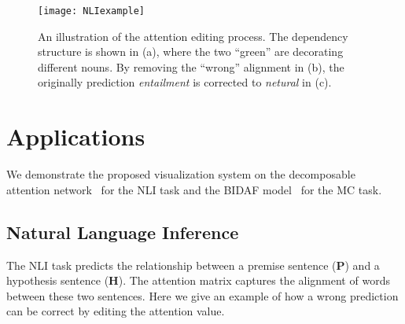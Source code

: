 \begin{figure*}[t]
\centering
\vspace{-2mm}
 \texttt{[image: NLIexample]}
  \vspace{-7mm}
 \caption{
An illustration of the attention editing process.
The dependency structure is shown in (a), where the two ``green'' are decorating different nouns.
By removing the ``wrong'' alignment in (b), the originally prediction \emph{entailment} is corrected to \emph{netural} in (c).
}
\vspace{-2mm}
\label{fig:NLIexample}
\end{figure*}

\section{Applications}
We demonstrate the proposed visualization system on the decomposable attention network~\cite{parikh2016emnlp}
for the NLI task and the BIDAF model~\cite{Seo2016} for the MC task.

\subsection{Natural Language Inference}
\label{sec:NLIexample}
The NLI task predicts the relationship between a premise sentence (\textbf{P}) and a hypothesis sentence (\textbf{H}).
The attention matrix captures the alignment of words between these two sentences.
Here we give an example of how a wrong prediction can be correct by editing the attention value.  


